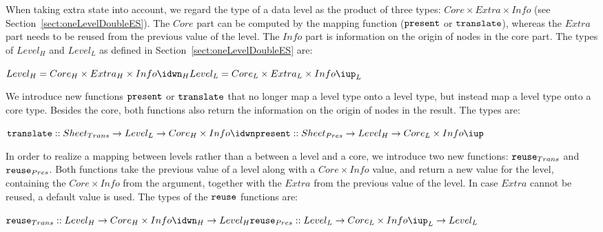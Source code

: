 When taking extra state into account, we regard the type of a data level as the product of three types: 
$Core \times Extra \times Info$ (see Section~\ref{sect:oneLevelDoubleES}). The $Core$ part can be computed by the mapping function (${\tt present}$ or ${\tt translate}$), whereas the $Extra$ part needs to be reused from the previous value of the level. The $Info$ part is information on the origin of nodes in the core part. The types of $Level_{H}$ and $Level_{L}$ as defined in Section~\ref{sect:oneLevelDoubleES} are: 

\begin{small}\begin{math} 
Level_{H} = Core_{H} \times Extra_{H} \times Info\idwn_{H}\\
Level_{L} = Core_{L} \times Extra_{L} \times Info\iup_{L}\\
\end{math}\end{small}

We introduce new functions ${\tt present}$ or ${\tt translate}$ that no longer map a level type onto a level type, but instead map a level type onto a core type. Besides the core, both functions also return the information on the origin of nodes in the result. The types are:

\begin{small}\begin{math}
{\tt translate} :: Sheet_{Trans} \rightarrow Level_{L} \rightarrow Core_{H}\times Info\idwn\\
{\tt present} :: Sheet_{Pres} \rightarrow  Level_{H} \rightarrow Core_{L}\times Info\iup\\
\end{math}\end{small}

In order to realize a mapping between levels rather than a between a level and a core, we introduce two new functions: ${\tt reuse}_{Trans}$  and ${\tt reuse}_{Pres}$. Both functions take the previous value of a level along with a $Core \times Info$ value, and return a new value for the level, containing the $Core \times Info$ from the argument, together with the $Extra$ from the previous value of the level. In case $Extra$  cannot be reused, a default value is used. The types of the ${\tt reuse}$ functions are:

\begin{small}\begin{math}
{\tt reuse}_{Trans} ::  Level_{H} \rightarrow Core_{H} \times Info\idwn_{H} \rightarrow Level_{H}\\
{\tt reuse}_{Pres} ::  Level_{L}  \rightarrow Core_{L} \times Info\iup_{L}    \rightarrow Level_{L}\\
\end{math}\end{small} 

